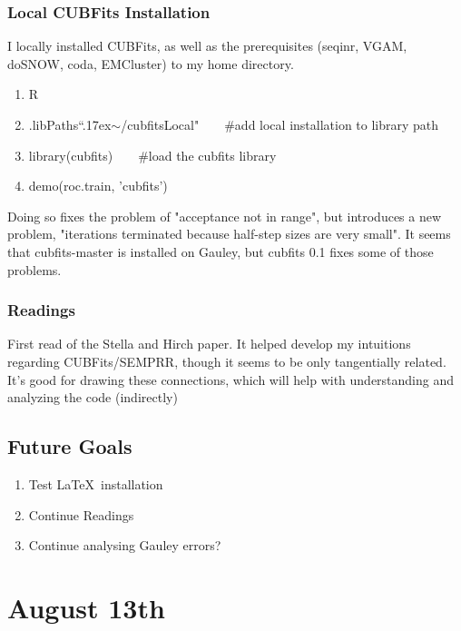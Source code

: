 \subsubsection{Local CUBFits Installation}

I locally installed CUBFits, as well as the prerequisites (seqinr, VGAM, doSNOW,  coda, EMCluster) to my home directory.

\begin{enumerate}
\item R
\item .libPaths{``{\raise.17ex\hbox{$\scriptstyle\sim$}}/cubfitsLocal"}~~~~\#add local installation to library path
\item library(cubfits)~~~~\#load the cubfits library
\item demo(roc.train, 'cubfits')
\end{enumerate}

Doing so fixes the problem of "acceptance not in range", but introduces a new problem, "iterations terminated because half-step sizes are very small". It seems that cubfits-master is installed on Gauley, but cubfits 0.1 fixes some of those problems.



\subsubsection{Readings}
First read of the Stella and Hirch paper. It helped develop my intuitions regarding CUBFits/SEMPRR, though it seems to be only tangentially related. It's good for drawing these connections, which will help with understanding and analyzing the code (indirectly)

\subsection{Future Goals}
\begin{enumerate}
\item Test \LaTeX~installation
\item Continue Readings
\item Continue analysing Gauley errors?
\end{enumerate}



\newpage
\setcounter{section}{12}
\setcounter{subsection}{-1}
\setcounter{subsubsection}{0}

\section{August 13th}
